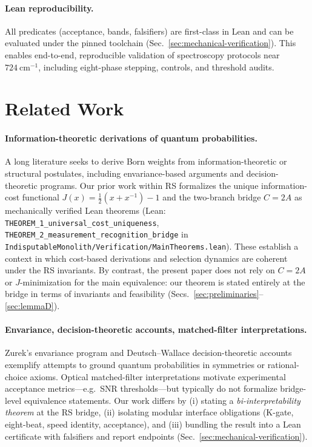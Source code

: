 \documentclass[12pt,a4paper]{article}
\begin{document}
\paragraph{Lean reproducibility.}
All predicates (acceptance, bands, falsifiers) are first-class in Lean and can be evaluated under the pinned toolchain (Sec.~\ref{sec:mechanical-verification}). This enables end-to-end, reproducible validation of spectroscopy protocols near \(724~\mathrm{cm}^{-1}\), including eight-phase stepping, controls, and threshold audits.

\section{Related Work}
\label{sec:related-work}

\paragraph{Information-theoretic derivations of quantum probabilities.}
A long literature seeks to derive Born weights from information-theoretic or structural postulates, including envariance-based arguments and decision-theoretic programs. Our prior work within RS formalizes the unique information-cost functional
\(
  J(x)=\tfrac{1}{2}(x+x^{-1})-1
\)
and the two-branch bridge \(C=2A\) as mechanically verified Lean theorems (Lean: \texttt{THEOREM\_1\_universal\_cost\_uniqueness}, \texttt{THEOREM\_2\_measurement\_recognition\_bridge} in \texttt{IndisputableMonolith/Verification/MainTheorems.lean}). These establish a context in which cost-based derivations and selection dynamics are coherent under the RS invariants. By contrast, the present paper does not rely on \(C{=}2A\) or \(J\)-minimization for the main equivalence: our theorem is stated entirely at the bridge in terms of invariants and feasibility (Secs.~\ref{sec:preliminaries}--\ref{sec:lemmaD}).

\paragraph{Envariance, decision-theoretic accounts, matched-filter interpretations.}
Zurek's envariance program and Deutsch--Wallace decision-theoretic accounts exemplify attempts to ground quantum probabilities in symmetries or rational-choice axioms. Optical matched-filter interpretations motivate experimental acceptance metrics---e.g.\ SNR thresholds---but typically do not formalize bridge-level equivalence statements. Our work differs by (i) stating a \emph{bi-interpretability theorem} at the RS bridge, (ii) isolating modular interface obligations (K-gate, eight-beat, speed identity, acceptance), and (iii) bundling the result into a Lean certificate with falsifiers and report endpoints (Sec.~\ref{sec:mechanical-verification}).
\end{document}
